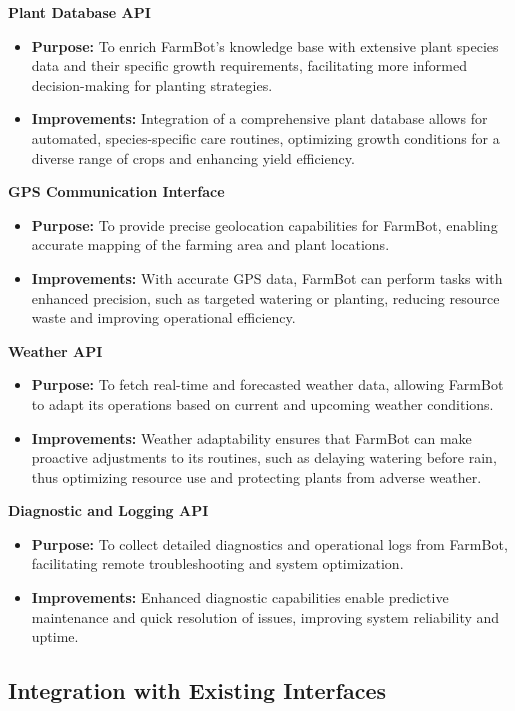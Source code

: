 \textbf{Plant Database API}
\begin{itemize}
    \item \textbf{Purpose:} To enrich FarmBot's knowledge base with extensive plant species data and their specific growth requirements, facilitating more informed decision-making for planting strategies.
    \item \textbf{Improvements:} Integration of a comprehensive plant database allows for automated, species-specific care routines, optimizing growth conditions for a diverse range of crops and enhancing yield efficiency.
\end{itemize}

\textbf{GPS Communication Interface}
\begin{itemize}
    \item \textbf{Purpose:} To provide precise geolocation capabilities for FarmBot, enabling accurate mapping of the farming area and plant locations.
    \item \textbf{Improvements:} With accurate GPS data, FarmBot can perform tasks with enhanced precision, such as targeted watering or planting, reducing resource waste and improving operational efficiency.
\end{itemize}

\textbf{Weather API}
\begin{itemize}
    \item \textbf{Purpose:} To fetch real-time and forecasted weather data, allowing FarmBot to adapt its operations based on current and upcoming weather conditions.
    \item \textbf{Improvements:} Weather adaptability ensures that FarmBot can make proactive adjustments to its routines, such as delaying watering before rain, thus optimizing resource use and protecting plants from adverse weather.
\end{itemize}

\textbf{Diagnostic and Logging API}
\begin{itemize}
    \item \textbf{Purpose:} To collect detailed diagnostics and operational logs from FarmBot, facilitating remote troubleshooting and system optimization.
    \item \textbf{Improvements:} Enhanced diagnostic capabilities enable predictive maintenance and quick resolution of issues, improving system reliability and uptime.
\end{itemize}

\subsection{Integration with Existing Interfaces}

